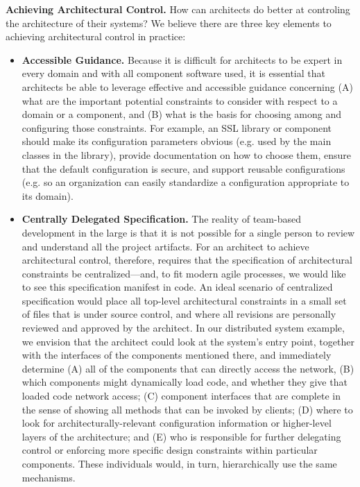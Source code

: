 \documentclass[runningheads]{llncs}
\newcommand{\minisec}[1]{\vspace{2ex}\noindent\textbf{#1}}
\begin{document}
\begin{sloppypar}
\minisec{Achieving Architectural Control.} How can architects do better at controling the architecture of their systems?  We believe there are three key elements to achieving architectural control in practice:

\begin{itemize}

\item \textbf{Accessible Guidance.}  Because it is difficult for architects to be expert in every domain and with all component software used, it is essential that architects be able to leverage effective and accessible guidance concerning (A) what are the important potential constraints to consider with respect to a domain or a component, and (B) what is the basis for choosing among and configuring those constraints.  For example, an SSL library or component should make its configuration parameters obvious (e.g. used by the main classes in the library), provide documentation on how to choose them, ensure that the default configuration is secure, and support reusable configurations (e.g. so an organization can easily standardize a configuration appropriate to its domain).

\item \textbf{Centrally Delegated Specification.}  The reality of team-based development in the large is that it is not possible for a single person to review and understand all the project artifacts.  For an architect to achieve architectural control, therefore, requires that the specification of architectural constraints be centralized---and, to fit modern agile processes, we would like to see this specification manifest in code.  An ideal scenario of centralized specification would place all top-level architectural constraints in a small set of files that is under source control, and where all revisions are personally reviewed and approved by the architect.  In our distributed system example, we envision that the architect could look at the system's entry point, together with the interfaces of the components mentioned there, and immediately determine (A) all of the components that can directly access the network, (B) which components might dynamically load code, and whether they give that loaded code network access; (C) component interfaces that are complete in the sense of showing all methods that can be invoked by clients; (D) where to look for architecturally-relevant configuration information or higher-level layers of the architecture; and (E) who is responsible for further delegating control or enforcing more specific design constraints within particular components. These individuals would, in turn, hierarchically use the same mechanisms.


\end{itemize}
\end{sloppypar}
\end{document}
